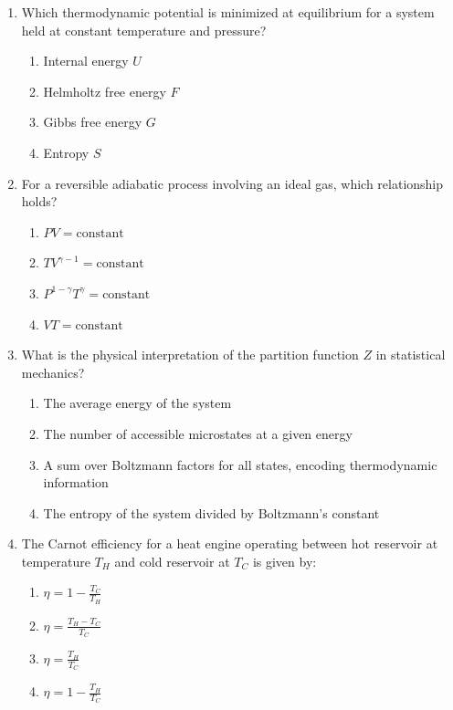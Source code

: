 \documentclass[11pt]{article}
\begin{document}
\begin{enumerate}[label=\textbf{\arabic*.}]

  \item Which thermodynamic potential is minimized at equilibrium for a system held at constant 
  temperature and pressure?
  \begin{enumerate}[label=(\Alph*)]
    \item Internal energy $U$
    \item Helmholtz free energy $F$
    \item Gibbs free energy $G$
    \item Entropy $S$
  \end{enumerate}

  \item For a reversible adiabatic process involving an ideal gas, which relationship holds?
  \begin{enumerate}[label=(\Alph*)]
    \item $PV = \text{constant}$
    \item $TV^{\gamma-1} = \text{constant}$
    \item $P^{1-\gamma}T^{\gamma} = \text{constant}$
    \item $VT = \text{constant}$
  \end{enumerate}

  \item What is the physical interpretation of the partition function $Z$ in statistical mechanics?
  \begin{enumerate}[label=(\Alph*)]
    \item The average energy of the system
    \item The number of accessible microstates at a given energy
    \item A sum over Boltzmann factors for all states, encoding thermodynamic information
    \item The entropy of the system divided by Boltzmann's constant
  \end{enumerate}

  \item The Carnot efficiency for a heat engine operating between hot reservoir at temperature 
  $T_H$ and cold reservoir at $T_C$ is given by:
  \begin{enumerate}[label=(\Alph*)]
    \item $\eta = 1 - \frac{T_C}{T_H}$
    \item $\eta = \frac{T_H - T_C}{T_C}$
    \item $\eta = \frac{T_H}{T_C}$
    \item $\eta = 1 - \frac{T_H}{T_C}$
  \end{enumerate}


\end{enumerate}
\end{document}
